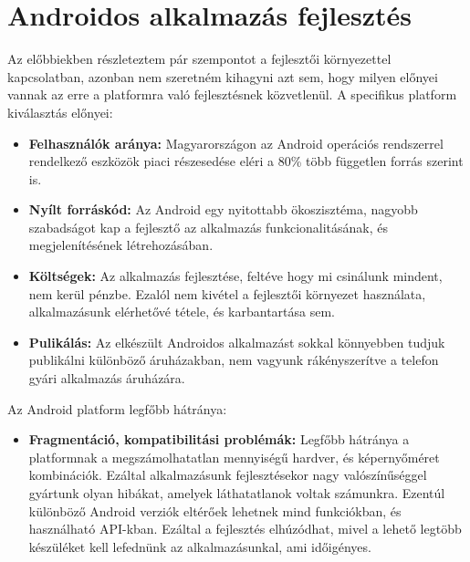 \section{Androidos alkalmazás fejlesztés}

Az előbbiekben részleteztem pár szempontot a fejlesztői környezettel kapcsolatban, azonban nem szeretném kihagyni azt sem, hogy milyen előnyei vannak az erre a platformra való fejlesztésnek közvetlenül.
A specifikus platform kiválasztás előnyei:
\begin{itemize}
    \item \textbf{Felhasználók aránya:} Magyarországon az Android operációs rendszerrel rendelkező eszközök piaci részesedése eléri a 80\% több független forrás szerint is.\cite{statistic1}\cite{statistic2}
    \item \textbf{Nyílt forráskód:} Az Android egy nyitottabb ökoszisztéma\cite{aosp}, nagyobb szabadságot kap a fejlesztő az alkalmazás funkcionalitásának, és megjelenítésének létrehozásában.
    \item \textbf{Költségek:} Az alkalmazás fejlesztése, feltéve hogy mi csinálunk mindent, nem kerül pénzbe. Ezalól nem kivétel a fejlesztői környezet használata, alkalmazásunk elérhetővé tétele, és karbantartása sem.
    \item \textbf{Pulikálás:} Az elkészült Androidos alkalmazást sokkal könnyebben tudjuk publikálni különböző áruházakban\cite{fdroid}, nem vagyunk rákényszerítve a telefon gyári alkalmazás áruházára.
\end{itemize}

Az Android platform legfőbb hátránya:

\begin{itemize}
    \item \textbf{Fragmentáció, kompatibilitási problémák:} Legfőbb hátránya a platformnak a megszámolhatatlan mennyiségű hardver, és képernyőméret kombinációk. Ezáltal alkalmazásunk fejlesztésekor nagy valószínűséggel gyártunk olyan hibákat, amelyek láthatatlanok voltak számunkra. Ezentúl különböző Android verziók eltérőek lehetnek mind funkciókban, és használható API-kban. Ezáltal a fejlesztés elhúzódhat, mivel a lehető legtöbb készüléket kell lefednünk az alkalmazásunkal, ami időigényes.
\end{itemize}
